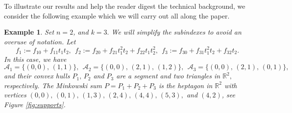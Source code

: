 \documentclass[a4paper,11pt]{amsart}
\newcommand{\R}{\mathbb{R}}
\newcommand{\cA}{{\mathcal A}}
\newcounter{thm}
\numberwithin{thm}{section}
\numberwithin{equation}{section}
\theoremstyle{definition}
\newtheorem{example}[thm]{Example}
\theoremstyle{plain}
\begin{document}
To illustrate our results and help the reader digest the technical background, we consider the following example which we will carry out all along the paper.
\begin{example}\label{running}
{\em 
 Set $n=2$, and $k=3.$ We will simplify the subindexes to avoid an overuse of notation. Let 
$$
f_1:=f_{10}+f_{11} t_1t_2, \ \ f_2:=f_{20}+f_{21}t_1^2t_2+f_{22}t_1t_2^2, \ \ f_3:=f_{30}+f_{31}t_1^2t_2+f_{32}t_2.
$$
In this case, we have
$$\cA_1=\{(0,0),\, (1,1)\},\ \  \cA_2=\{(0,0),\,(2,1),\,(1,2)\}, \ \ \cA_3=\{(0,0),\, (2,1),\,(0,1)\},
$$
and their convex hulls $P_1,\,P_2$ and $P_3$ are a segment and two triangles in $\R^2,$ respectively.  The Minkowski sum $P=P_1+P_2+P_3$ is the heptagon in $\R^2$ with vertices \newline $(0,0),\,(0,1),\,(1,3),\,(2,4),\,(4,4),\,(5,3),$ and $(4,2)$, see Figure \ref{fig:supports}.
}

\end{example}
\end{document}
